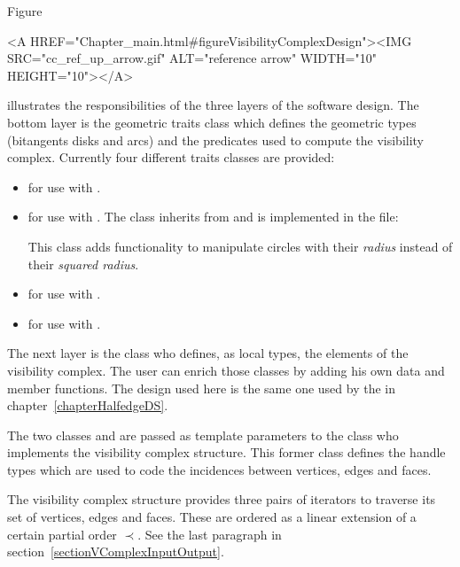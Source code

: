 Figure~\ccTexHtml{\ref{figureVisibilityComplexDesign}}{}
\begin{ccHtmlOnly}
  <A HREF="Chapter_main.html#figureVisibilityComplexDesign"><IMG
  SRC="cc_ref_up_arrow.gif" ALT="reference arrow" WIDTH="10" HEIGHT="10"></A>
\end{ccHtmlOnly}
illustrates the responsibilities of the three layers of the software design.
The bottom layer is the geometric traits class  which defines the
geometric types (bitangents disks and arcs) and the predicates used to compute
the visibility complex. Currently four different traits classes are provided:
\begin{itemize}
    \item {} for use with
    .
    \item {} for use with
    . The class 
    inherits from  and is implemented in the file: 
    \begin{quote}
    \end{quote}
    This class adds functionality to manipulate circles with their \emph{radius}
    instead of their \emph{squared radius}. 
    \item {} for use with
    .
    \item {} for use with
    .
\end{itemize}
The next layer is the  class who defines, as local types, the
elements of the visibility complex. The user can enrich those classes by adding
his own data and member functions. The design used here is the same one used by
the  in chapter~\ref{chapterHalfedgeDS}.

The two classes  and  are passed as template parameters
to the class  who implements the
visibility complex structure. This former class defines the handle types which
are used to code the incidences between vertices, edges and faces. 

The visibility complex structure provides three pairs of iterators to traverse
its set of vertices, edges and faces. These are ordered as a linear extension of
a certain partial order $\prec$. See the last paragraph in
section~\ref{sectionVComplexInputOutput}.
